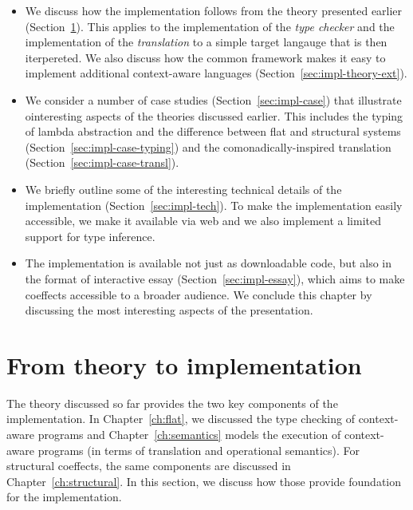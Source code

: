 \begin{itemize}
\item We discuss how the implementation follows from the theory presented earlier (Section~\ref{sec:impl-theory}).
  This applies to the implementation of the \emph{type checker} and the implementation of the \emph{translation}
  to a simple target langauge that is then iterpereted. We also discuss how the common framework makes it
  easy to implement additional context-aware languages (Section~\ref{sec:impl-theory-ext}).

\item We consider a number of case studies (Section~\ref{sec:impl-case}) that illustrate ointeresting
  aspects of the theories discussed earlier. This includes the typing of lambda abstraction and the
  difference between flat and structural systems (Section~\ref{sec:impl-case-typing}) and the
  comonadically-inspired translation (Section~\ref{sec:impl-case-transl}).

\item We briefly outline some of the interesting technical details of the implementation
  (Section~\ref{sec:impl-tech}). To make the implementation easily accessible, we make it
  available via web and we also implement a limited support for type inference.

\item The implementation is available not just as downloadable code, but also in the format of interactive essay
  (Section~\ref{sec:impl-essay}), which aims to make coeffects accessible to a broader audience.
  We conclude this chapter by discussing the most interesting aspects of the presentation.
\end{itemize}


%
%

\section{From theory to implementation}
\label{sec:impl-theory}

The theory discussed so far provides the two key components of the implementation. In
Chapter~\ref{ch:flat}, we discussed the type checking of context-aware programs and
Chapter~\ref{ch:semantics} models the execution of context-aware programs (in terms of
translation and operational semantics). For structural coeffects, the same components are discussed
in Chapter~\ref{ch:structural}. In this section, we discuss how those provide foundation for the
implementation.

